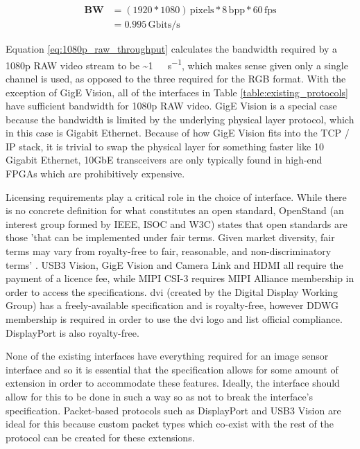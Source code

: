 \begin{equation}
  \begin{split}
    \mathbf{BW} &= (1920*1080) \, \mathrm{pixels} * 8  \, \mathrm{bpp} * 60 \, \mathrm{fps} \\
                &= 0.995  \, \mathrm{Gbits/s}
  \end{split}  
  \label{eq:1080p_raw_throughput}
\end{equation}

Equation \ref{eq:1080p_raw_throughput} calculates the bandwidth required by a 1080p RAW video stream to be \SI{~1}{\giga\bit\per\second}, which makes sense given only a single channel is used, as opposed to the three required for the RGB format. With the exception of GigE Vision, all of the interfaces in Table \ref{table:existing_protocols} have sufficient bandwidth for 1080p RAW video. GigE Vision is a special case because the bandwidth is limited by the underlying physical layer protocol, which in this case is Gigabit Ethernet. Because of how GigE Vision fits into the TCP / IP stack, it is trivial to swap the physical layer for something faster like 10 Gigabit Ethernet, 10GbE transceivers are only typically found in high-end FPGAs which are prohibitively expensive.

Licensing requirements play a critical role in the choice of interface. While there is no concrete definition for what constitutes an open standard, OpenStand (an interest group formed by IEEE, ISOC and W3C) states that open standards are those 'that can be implemented under fair terms. Given market diversity, fair terms may vary from royalty-free to fair, reasonable, and non-discriminatory terms' \cite{open_standard_definition}. USB3 Vision, GigE Vision and Camera Link and HDMI all require the payment of a licence fee, while MIPI CSI-3 requires MIPI Alliance membership in order to access the specifications. \gls{dvi} (created by the Digital Display Working Group) has a freely-available specification and is royalty-free, however DDWG membership is required in order to use the \gls{dvi} logo and list official compliance. DisplayPort is also royalty-free.

None of the existing interfaces have everything required for an image sensor interface and so it is essential that the specification allows for some amount of extension in order to accommodate these features. Ideally, the interface should allow for this to be done in such a way so as not to break the interface's specification. Packet-based protocols such as DisplayPort and USB3 Vision are ideal for this because custom packet types which co-exist with the rest of the protocol can be created for these extensions. 

